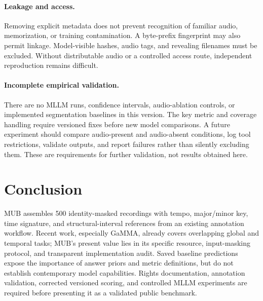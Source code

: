 \documentclass[11pt,a4paper]{article}
\begin{document}
\paragraph{Leakage and access.}
Removing explicit metadata does not prevent recognition of familiar audio, memorization, or training contamination. A byte-prefix fingerprint may also permit linkage. Model-visible hashes, audio tags, and revealing filenames must be excluded. Without distributable audio or a controlled access route, independent reproduction remains difficult.

\paragraph{Incomplete empirical validation.}
There are no MLLM runs, confidence intervals, audio-ablation controls, or implemented segmentation baselines in this version. The key metric and coverage handling require versioned fixes before new model comparisons. A future experiment should compare audio-present and audio-absent conditions, log tool restrictions, validate outputs, and report failures rather than silently excluding them. These are requirements for further validation, not results obtained here.

\section{Conclusion}
MUB assembles 500 identity-masked recordings with tempo, major/minor key, time signature, and structural-interval references from an existing annotation workflow. Recent work, especially GaMMA, already covers overlapping global and temporal tasks; MUB's present value lies in its specific resource, input-masking protocol, and transparent implementation audit. Saved baseline predictions expose the importance of answer priors and metric definitions, but do not establish contemporary model capabilities. Rights documentation, annotation validation, corrected versioned scoring, and controlled MLLM experiments are required before presenting it as a validated public benchmark.
\end{document}
